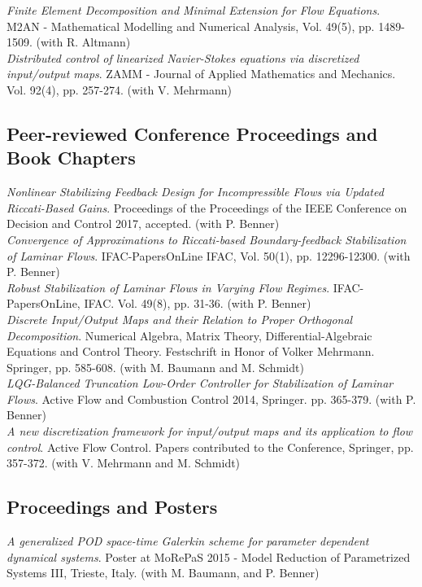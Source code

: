 \documentclass[11pt, a4paper]{article} %
\newcommand{\years}[1]{\marginnote{\scriptsize #1}} %
\begin{document}
\years{2015} \emph{Finite Element Decomposition and Minimal Extension for Flow Equations}. M2AN - Mathematical Modelling and Numerical Analysis, Vol. 49(5), pp. 1489-1509. (with R. Altmann) \\

\years{2012} \emph{Distributed control of linearized Navier-Stokes equations via discretized input/output maps}. ZAMM - Journal of Applied Mathematics and Mechanics. Vol. 92(4), pp. 257-274. (with V. Mehrmann) 


\vspace{.1in}
\subsection*{Peer-reviewed Conference Proceedings and Book Chapters}

\years{2017} \emph{Nonlinear Stabilizing Feedback Design for Incompressible Flows via Updated Riccati-Based Gains}. Proceedings of the Proceedings of the IEEE Conference on Decision and Control 2017, accepted. (with P. Benner) \\ 

\years{2017} \emph{Convergence of Approximations to Riccati-based Boundary-feedback Stabilization of Laminar Flows}. IFAC-PapersOnLine IFAC, Vol. 50(1), pp. 12296-12300. (with P. Benner)\\

\years{2016} \emph{Robust Stabilization of Laminar Flows in Varying Flow Regimes}. IFAC-PapersOnLine, IFAC. Vol. 49(8), pp. 31-36. (with P. Benner)\\
\newpage
\years{2015} \emph{Discrete Input/Output Maps and their Relation to Proper Orthogonal Decomposition}. Numerical Algebra, Matrix Theory, Differential-Algebraic Equations and Control Theory. Festschrift in Honor of Volker Mehrmann. Springer, pp. 585-608. (with M. Baumann and M. Schmidt) \\

\years{2015} \emph{LQG-Balanced Truncation Low-Order Controller for Stabilization of Laminar Flows}. Active Flow and Combustion Control 2014, Springer. pp. 365-379. (with P. Benner) \\

\years{2010} \emph{A new discretization framework for input/output maps and its application to flow control}. Active Flow Control. Papers contributed to the Conference, Springer, pp. 357-372. (with V. Mehrmann and M. Schmidt) 

\vspace{.1in}
\subsection*{Proceedings and Posters}
\years{2015} \emph{A generalized POD space-time Galerkin scheme for parameter dependent dynamical systems}. Poster at MoRePaS 2015 - Model Reduction of Parametrized Systems III, Trieste, Italy. (with M. Baumann, and P. Benner)\\
\end{document}
